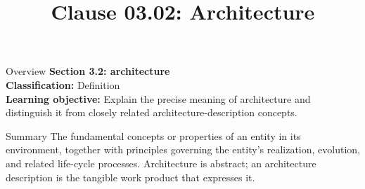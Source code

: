 \documentclass[10pt,letterpaper]{article}
\title{Clause 03.02: Architecture}
\author{}
\date{}
\begin{document}
\maketitle
\begin{CornellOverviewBox}{Overview}
{\Large\bfseries\textcolor{CNavy}{Section 3.2: architecture}}\\[3pt]
{\small\textbf{Classification:} Definition}\\
{\small\textbf{Learning objective:} Explain the precise meaning of architecture and distinguish it from closely related architecture-description concepts.}
\end{CornellOverviewBox}
\vspace{3pt}

\begin{CornellNotesTable}
\end{CornellNotesTable}


\begin{CornellSummaryBox}{Summary}
The fundamental concepts or properties of an entity in its environment, together with principles governing the entity’s realization, evolution, and related life-cycle processes. Architecture is abstract; an architecture description is the tangible work product that expresses it.
\end{CornellSummaryBox}
\end{document}
